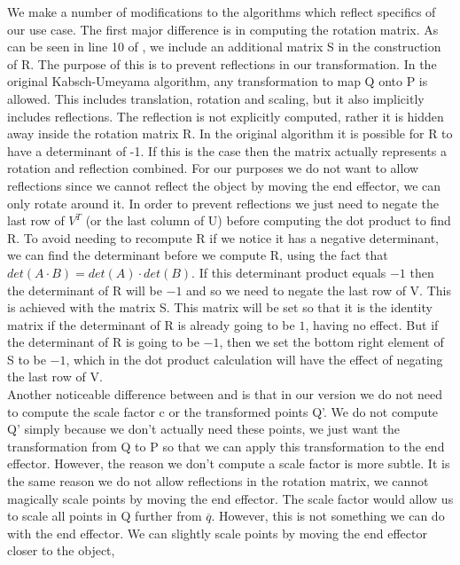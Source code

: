 We make a number of modifications to the algorithms which reflect specifics of our use case. The first major difference is in computing the rotation matrix. As can be seen in line 10 of , we include an additional matrix S in the construction of R. The purpose of this is to prevent reflections in our transformation. In the original Kabsch-Umeyama algorithm, any transformation to map Q onto P is allowed. This includes translation, rotation and scaling, but it also implicitly includes reflections. The reflection is not explicitly computed, rather it is hidden away inside the rotation matrix R. In the original algorithm it is possible for R to have a determinant of -1. If this is the case then the matrix actually represents a rotation and reflection combined. For our purposes we do not want to allow reflections since we cannot reflect the object by moving the end effector, we can only rotate around it. In order to prevent reflections we just need to negate the last row of $V^T$ (or the last column of U) before computing the dot product to find R. To avoid needing to recompute R if we notice it has a negative determinant, we can find the determinant before we compute R, using the fact that $det(A \cdot B) = det(A) \cdot det(B)$. If this determinant product equals $-1$ then the determinant of R will be $-1$ and so we need to negate the last row of V. This is achieved with the matrix S. This matrix will be set so that it is the identity matrix if the determinant of R is already going to be $1$, having no effect. But if the determinant of R is going to be $-1$, then we set the bottom right element of S to be $-1$, which in the dot product calculation will have the effect of negating the last row of V.\\

Another noticeable difference between  and  is that in our version we do not need to compute the scale factor c or the transformed points Q'. We do not compute Q' simply because we don't actually need these points, we just want the transformation from Q to P so that we can apply this transformation to the end effector. However, the reason we don't compute a scale factor is more subtle. It is the same reason we do not allow reflections in the rotation matrix, we cannot magically scale points by moving the end effector. The scale factor would allow us to scale all points in Q further from $\overline{q}$. However, this is not something we can do with the end effector. We can slightly scale points by moving the end effector closer to the object, %
\\

